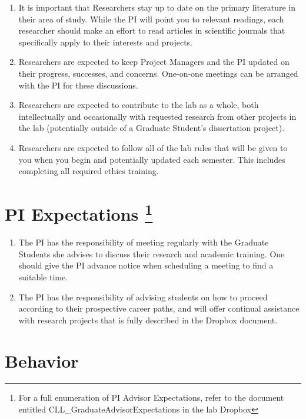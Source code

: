 \documentclass[
]{book}
\begin{document}
\begin{enumerate}
\def\labelenumi{\arabic{enumi}.}
\item
  It is important that Researchers stay up to date on the primary literature in their area of study. While the PI will point you to relevant readings, each researcher should make an effort to read articles in scientific journals that specifically apply to their interests and projects.
\item
  Researchers are expected to keep Project Managers and the PI updated on their progress, successes, and concerns. One-on-one meetings can be arranged with the PI for these discussions.
\item
  Researchers are expected to contribute to the lab as a whole, both intellectually and occasionally with requested research from other projects in the lab (potentially outside of a Graduate Student's dissertation project).
\item
  Researchers are expected to follow all of the lab rules that will be given to you when you begin and potentially updated each semester. This includes completing all required ethics training.
\end{enumerate}

\hypertarget{pi-expectations}{%
\section[PI Expectations ]{\texorpdfstring{PI Expectations \footnote{For a full enumeration of PI Advisor Expectations, refer to the document entitled CLL\_GraduateAdvisorExpectations in the lab Dropbox}}{PI Expectations }}\label{pi-expectations}}

\begin{enumerate}
\def\labelenumi{\arabic{enumi}.}
\item
  The PI has the responsibility of meeting regularly with the Graduate Students she advises to discuss their research and academic training. One should give the PI advance notice when scheduling a meeting to find a suitable time.
\item
  The PI has the responsibility of advising students on how to proceed according to their prospective career paths, and will offer continual assistance with research projects that is fully described in the Dropbox document.
\end{enumerate}

\hypertarget{behavior}{%
\section{Behavior}\label{behavior}}
\end{document}
